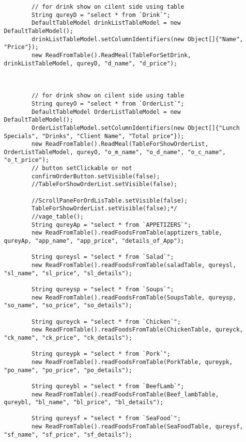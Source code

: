 \documentclass[12pt,a4paper]{article}
\begin{document}
\begin{lstlisting}
        // for drink show on cilent side using table
        String qureyD = "select * from `Drink`";
        DefaultTableModel drinkListTableModel = new DefaultTableModel();
        drinkListTableModel.setColumnIdentifiers(new Object[]{"Name", "Price"});
        new ReadFromTable().ReadMeal(TableForSetDrink, drinkListTableModel, qureyD, "d_name", "d_price");
        
        
        
        // for drink show on cilent side using table
        String qureyO = "select * from `OrderList`";
        DefaultTableModel OrderListTableModel = new DefaultTableModel();
        OrderListTableModel.setColumnIdentifiers(new Object[]{"Lunch Specials", "Drinks", "Client Name", "Total price"});
        new ReadFromTable().ReadMeal(TableForShowOrderList, OrderListTableModel, qureyO, "o_m_name", "o_d_name", "o_c_name", "o_t_price");
        // button setClickable or not
        confirmOrderButton.setVisible(false);
        //TableForShowOrderList.setVisible(false);
        
        //ScrollPaneForOrdLisTable.setVisible(false);
        TableForShowOrderList.setVisible(false);*/
        //vage_table();
        String qureyAp = "select * from `APPETIZERS`";
        new ReadFromTable().readFoodsFromTable(apptizers_table, qureyAp, "app_name", "app_price", "details_of_App");

        String qureysl = "select * from `Salad`";
        new ReadFromTable().readFoodsFromTable(saladTable, qureysl, "sl_name", "sl_price", "sl_details");

        String qureysp = "select * from `Soups`";
        new ReadFromTable().readFoodsFromTable(SoupsTable, qureysp, "so_name", "so_price", "so_details");

        String qureyck = "select * from `Chicken`";
        new ReadFromTable().readFoodsFromTable(ChickenTable, qureyck, "ck_name", "ck_price", "ck_details");

        String qureypk = "select * from `Pork`";
        new ReadFromTable().readFoodsFromTable(PorkTable, qureypk, "po_name", "po_price", "po_details");

        String qureybl = "select * from `BeefLamb`";
        new ReadFromTable().readFoodsFromTable(Beef_lambTable, qureybl, "bl_name", "bl_price", "bl_details");

        String qureysf = "select * from `SeaFood`";
        new ReadFromTable().readFoodsFromTable(SeaFoodTable, qureysf, "sf_name", "sf_price", "sf_details");


\end{lstlisting}
\end{document}
